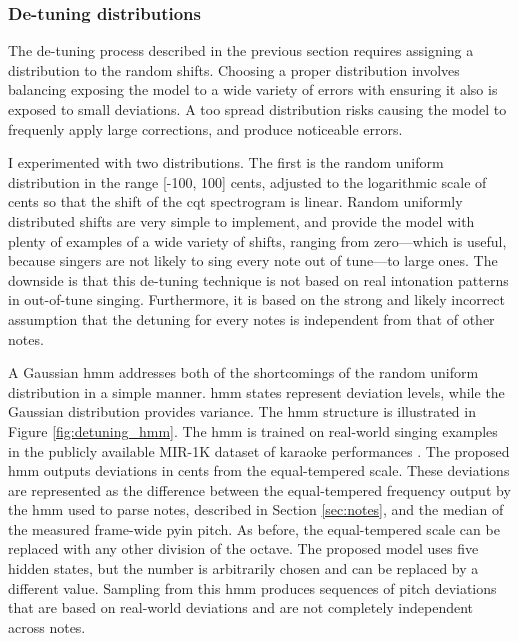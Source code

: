 \subsubsection{De-tuning distributions}
The de-tuning process described in the previous section requires assigning a distribution to the random shifts. Choosing a proper distribution involves balancing exposing the model to a wide variety of errors with ensuring it also is exposed to small deviations. A too spread distribution risks causing the model to frequenly apply large corrections, and produce noticeable errors. 

I experimented with two distributions. The first is the random uniform distribution in the range [-100, 100] cents, adjusted to the logarithmic scale of cents so that the shift of the \gls{cqt} spectrogram is linear. Random uniformly distributed shifts are very simple to implement, and provide the model with plenty of examples of a wide variety of shifts, ranging from zero---which is useful, because singers are not likely to sing every note out of tune---to large ones. The downside is that this de-tuning technique is not based on real intonation patterns in out-of-tune singing. Furthermore, it is based on the strong and likely incorrect assumption that the detuning for every notes is independent from that of other notes.

A Gaussian \gls{hmm} addresses both of the shortcomings of the random uniform distribution in a simple manner. \gls{hmm} states represent deviation levels, while the Gaussian distribution provides variance. The \gls{hmm} structure is illustrated in Figure \ref{fig:detuning_hmm}. The \gls{hmm} is trained on real-world singing examples in the publicly available MIR-1K dataset of karaoke performances \cite{su2009improvement}. The proposed \gls{hmm} outputs deviations in cents from the equal-tempered scale. These deviations are represented as the difference between the equal-tempered frequency output by the \gls{hmm} used to parse notes, described in Section \ref{sec:notes}, and the median of the measured frame-wide \gls{pyin} pitch. As before, the equal-tempered scale can be replaced with any other division of the octave. The proposed model uses five hidden states, but the number is arbitrarily chosen and can be replaced by a different value.  Sampling from this \gls{hmm} produces sequences of pitch deviations that are based on real-world deviations and are not completely independent across notes.

